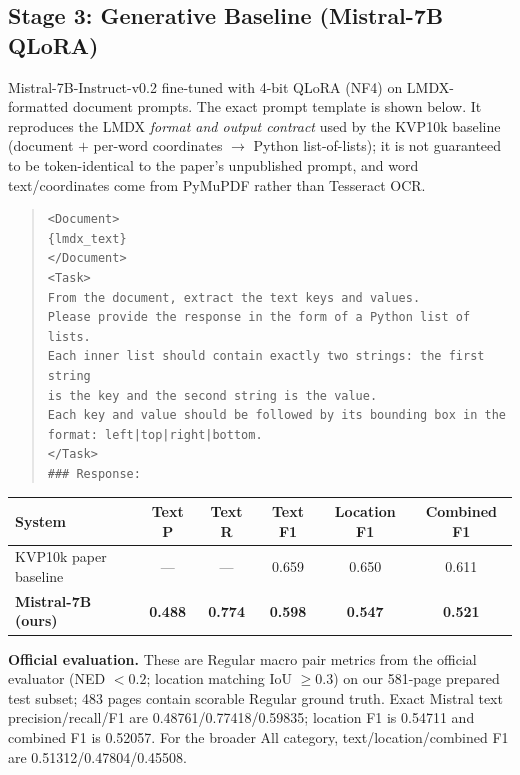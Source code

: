 \documentclass[11pt,a4paper]{article}
\begin{document}
\subsection{Stage 3: Generative Baseline (Mistral-7B QLoRA)}

Mistral-7B-Instruct-v0.2 fine-tuned with 4-bit QLoRA (NF4) on LMDX-formatted document prompts. The exact prompt template is shown below. It reproduces the LMDX \emph{format and output contract} used by the KVP10k baseline (document $+$ per-word coordinates $\to$ Python list-of-lists); it is not guaranteed to be token-identical to the paper's unpublished prompt, and word text/coordinates come from PyMuPDF rather than Tesseract OCR.

\begin{quote}\small
\begin{verbatim}
<Document>
{lmdx_text}
</Document>
<Task>
From the document, extract the text keys and values.
Please provide the response in the form of a Python list of lists.
Each inner list should contain exactly two strings: the first string
is the key and the second string is the value.
Each key and value should be followed by its bounding box in the
format: left|top|right|bottom.
</Task>
### Response:
\end{verbatim}
\end{quote}

\begin{center}
\small
\begin{tabular}{lccccc}
\toprule
\textbf{System} & \textbf{Text P} & \textbf{Text R} & \textbf{Text F1} & \textbf{Location F1} & \textbf{Combined F1} \\
\midrule
KVP10k paper baseline & --- & --- & 0.659 & 0.650 & 0.611 \\
\textbf{Mistral-7B (ours)} & \textbf{0.488} & \textbf{0.774} & \textbf{0.598} & \textbf{0.547} & \textbf{0.521} \\
\bottomrule
\end{tabular}
\end{center}

\noindent\textbf{Official evaluation.} These are Regular macro pair metrics
from the official evaluator (NED $<0.2$; location matching IoU $\geq0.3$) on
our 581-page prepared test subset; 483 pages contain scorable Regular ground
truth. Exact Mistral text precision/recall/F1 are
0.48761/0.77418/0.59835; location F1 is 0.54711 and combined F1 is 0.52057.
For the broader All category, text/location/combined F1 are
0.51312/0.47804/0.45508.
\end{document}
